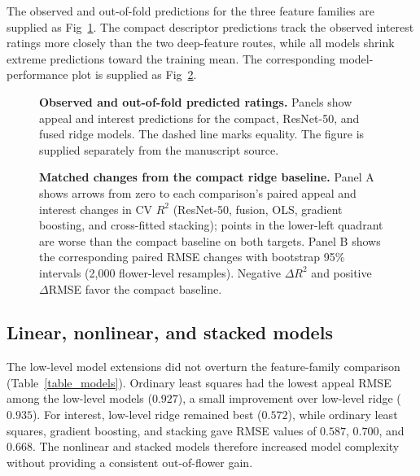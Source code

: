 \documentclass[10pt,letterpaper]{article}
\begin{document}
The observed and out-of-fold predictions for the three feature families are supplied as Fig~\ref{fig:predictions}. The compact descriptor predictions track the observed interest ratings more closely than the two deep-feature routes, while all models shrink extreme predictions toward the training mean. The corresponding model-performance plot is supplied as Fig~\ref{fig:matched}.

\begin{figure}[!h]
\caption{\textbf{Observed and out-of-fold predicted ratings.} Panels show appeal and interest predictions for the compact, ResNet-50, and fused ridge models. The dashed line marks equality. The figure is supplied separately from the manuscript source.}
\label{fig:predictions}
\end{figure}

\begin{figure}[!h]
\caption{\textbf{Matched changes from the compact ridge baseline.}
Panel A shows arrows from zero to each comparison's paired appeal and
interest changes in CV $R^2$ (ResNet-50, fusion, OLS, gradient boosting,
and cross-fitted stacking); points in the lower-left quadrant are worse
than the compact baseline on both targets. Panel B shows the corresponding
paired RMSE changes with bootstrap 95\% intervals (2,000 flower-level
resamples). Negative $\Delta R^2$ and positive $\Delta$RMSE favor the
compact baseline.}
\label{fig:matched}
\end{figure}

\subsection*{Linear, nonlinear, and stacked models}
The low-level model extensions did not overturn the feature-family comparison (Table~\ref{table_models}). Ordinary least squares had the lowest appeal RMSE among the low-level models ($0.927$), a small improvement over low-level ridge ($0.935$). For interest, low-level ridge remained best ($0.572$), while ordinary least squares, gradient boosting, and stacking gave RMSE values of $0.587$, $0.700$, and $0.668$. The nonlinear and stacked models therefore increased model complexity without providing a consistent out-of-flower gain.
\end{document}
